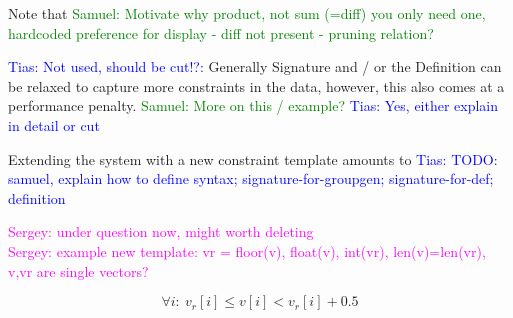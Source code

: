 \documentclass{IEEEtran}
\newcommand{\sergey}[1]{\textcolor{magenta}{{\sc Sergey:} #1}\xspace}
\newcommand{\samuel}[1]{\textcolor{green}{{\sc Samuel:} #1}\xspace}
\newcommand{\tias}[1]{\textcolor{blue}{{\sc Tias:} #1}\xspace}
\newcommand{\constraints}{\ensuremath{\mathcal{T}}\xspace}
\newcommand{\format}[1]{\textit{#1}\xspace}
\newcommand{\extractgroups}{\format{extractGroups}}
\newcommand{\extracttables}{\format{extractTables}}
\newcommand{\learnconstraints}{\format{LearnConstraints}}
\newcommand{\CSignature}{Signature\xspace}
\newcommand{\CFunction}{Definition\xspace}
\newcommand{\dependencies}{\ensuremath{\mathcal{D}}\xspace}
\theoremstyle{definition}
\begin{document}

Note that \samuel{Motivate why product, not sum (=diff) you only need one, hardcoded preference for display - diff not present - pruning relation?}

\tias{Not used, should be cut!?:}
Generally \CSignature and / or the \CFunction can be relaxed to capture more constraints in the data, however, this also comes at a performance penalty. \samuel{More on this / example?} \tias{Yes, either explain in detail or cut}

Extending the system with a new constraint template amounts to \tias{TODO: samuel, explain how to define syntax; signature-for-groupgen; signature-for-def; definition}

\sergey{under question now, might worth deleting} \\
\sergey{example new template: vr = floor(v), float(v), int(vr), len(v)=len(vr), v,vr are single vectors?}

\begin{equation}
  \forall i{:}~ v_r[i] \leq v[i] < v_r[i] + 0.5
  \label{eq:floor_extension}
\end{equation}



\end{document}
